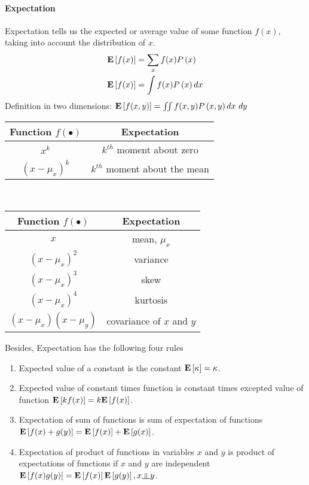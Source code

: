 \paragraph{Expectation}

Expectation tells us the expected or average value of some function $f(x)$, taking into account the distribution of $x$.
\begin{align*}
	\mathbf{E}\left[f(x)\right]&=\sum_x f(x)P\left(x\right) \\
	\mathbf{E}\left[f(x)\right]&=\int f(x)P\left(x\right)dx
\end{align*}
Definition in two dimensions: $\mathbf{E}\left[f(x,y)\right]=\iint f(x,y)P\left(x,y\right)dx\ dy$
	\begin{table*}[!h]
		\centering
		\begin{tabular}{|c|c|}
			\hline
			Function $f(\bullet)$ & Expectation \\
			\hline
			$x^k$ & $k^{th}$ moment about zero \\
			\hline
			$(x-\mu_x)^k$ & $k^{th}$ moment about the mean \\
			\hline
		\end{tabular}
		\
		\begin{tabular}{|c|c|}
			\hline
			Function $f(\bullet)$ & Expectation \\
			\hline
			$x$ & mean, $\mu_x$ \\
			\hline
			$(x-\mu_x)^2$ & variance \\
			\hline
			$(x-\mu_x)^3$ & skew \\
			\hline
			$(x-\mu_x)^4$ & kurtosis \\
			\hline
			$(x-\mu_x)(x-\mu_y)$ & covariance of $x$ and $y$ \\
			\hline
		\end{tabular}
	\end{table*}

Besides, Expectation has the following four rules
	\begin{enumerate}
		\item Expected value of a constant is the constant $\mathbf{E}\left[\kappa\right]=\kappa$.
		\item Expected value of constant times function is constant times excepted value of function $\mathbf{E}\left[kf(x)\right]=k\mathbf{E}\left[f(x)\right]$.
		\item Expectation of sum of functions is sum of expectation of functions \\ $\mathbf{E}\left[f(x)+g(y)\right]=\mathbf{E}\left[f(x)\right]+\mathbf{E}\left[g(x)\right]$.
		\item Expectation of product of functions in variables $x$ and $y$ is product of expectations of functions if $x$ and $y$ are independent $\E{f(x)g(y)}=\E{f(x)}\E{g(y)}, x \indep y$.
	\end{enumerate}

